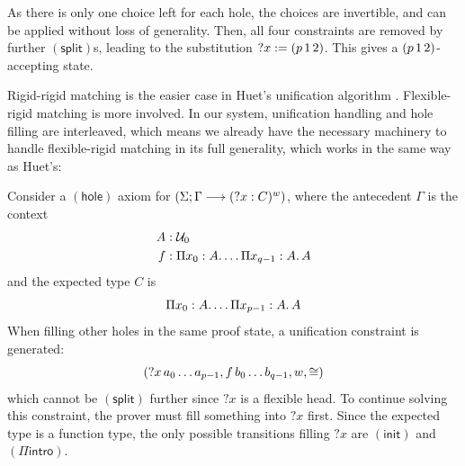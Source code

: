 \documentclass[twoside]{report}
\begin{document}
\begin{example}
    As there is only one choice left for each hole, the choices are invertible, and can be applied without loss of generality. Then, all four constraints are removed by further $(\mathsf{split})$s, leading to the substitution ${?x} := ({{p}\,{1}}\,{2})$. This gives a $({{p}\,{1}}\,{2})$-accepting state.
\end{example}

Rigid-rigid matching is the easier case in Huet's unification algorithm \cite{huet1975unification}. Flexible-rigid matching is more involved. In our system, unification handling and hole filling are interleaved, which means we already have the necessary machinery to handle flexible-rigid matching in its full generality, which works in the same way as Huet's:

\begin{example}
    Consider a $(\mathsf{hole})$ axiom for $(\Sigma; \Gamma \longrightarrow ({?x} : C)^w)$, where the antecedent $\Gamma$ is the context
    $$
        \begin{aligned}
            A & : \mathcal U_0                             \\
            f & : \Pi{x_0} : {A}.\,{\ldots \Pi{x_{q-1}} : {A}.\,{A}} \\
        \end{aligned}
    $$
    and the expected type $C$ is
    $$
        \Pi{x_0} : {A}.\,{\ldots \Pi{x_{p-1}} : {A}.\,{A}}
    $$
    When filling other holes in the same proof state, a unification constraint is generated:
    $$
        ({{{?x}\,{a_0}}\,{\ldots}}\,{a_{p-1}}, {{{f}\,{b_0}}\,{\ldots}}\,{b_{q-1}}, w, \cong)
    $$
    which cannot be $(\mathsf{split})$ further since ${?x}$ is a flexible head. To continue solving this constraint, the prover must fill something into ${?x}$ first. Since the expected type is a function type, the only possible transitions filling ${?x}$ are $(\mathsf{init})$ and $(\Pi\mathsf{intro})$.


\end{example}
\end{document}
